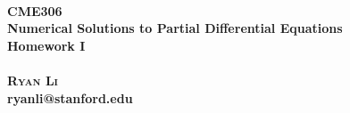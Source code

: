 \begin{titlepage}




\center %

\HRule \\[0.4cm]
 \bf \Huge CME306\\ %
\Huge Numerical Solutions to Partial Differential Equations\\[0.3cm] %
\Large Homework I %
\\[0.3cm] %
\HRule \\[1.5cm]





\Large \textsc{Ryan} \textsc{Li}\\ %
\large ryanli@stanford.edu\\[2.5cm]



\end{titlepage}
